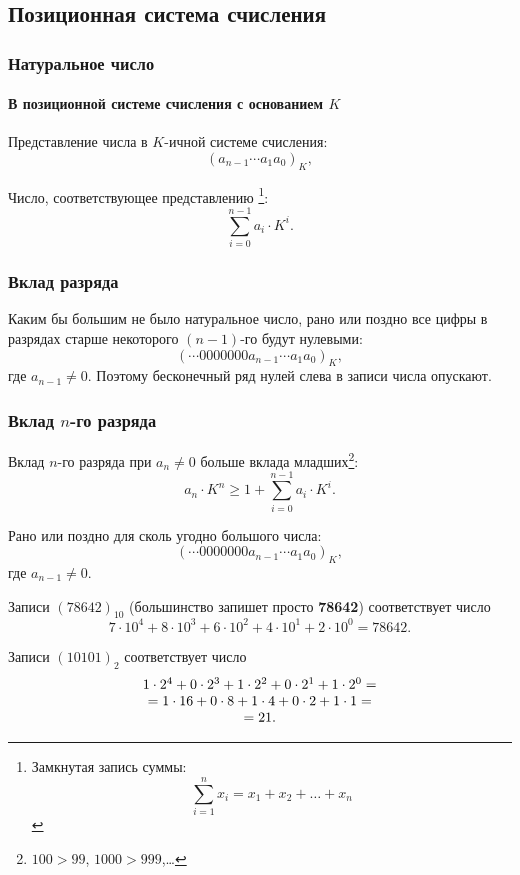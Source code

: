 \subsection{Позиционная система счисления}


\begin{frame}
    \frametitle{Натуральное число}
    \framesubtitle{В позиционной системе счисления с основанием $K$}

    Представление числа в $K$-ичной системе счисления:
    \[
        (a_{n-1}\cdots a_{1}a_{0})_K,
    \]
    
    Число, соответствующее представлению \footnote{Замкнутая запись суммы:\[\sum_{i=1}^{n}x_i = x_1 + x_2 + \ldots + x_n\]}:
    \[
        \sum_{i=0}^{n-1}a_i\cdot K^{i}.
    \]
\end{frame}

\begin{frame}
    \frametitle{Вклад разряда}

    Каким бы большим не было натуральное число, рано или поздно все цифры в разрядах старше некоторого $(n-1)$-го будут нулевыми:
    \[
        (\cdots 0000000a_{n-1}\cdots a_{1}a_{0})_K,
    \]
    где $a_{n-1}\neq 0$. Поэтому бесконечный ряд нулей слева в записи числа опускают.
\end{frame}

\begin{frame}
    \frametitle{Вклад $n$-го разряда}
    
    Вклад $n$-го разряда при $a_n\neq 0$ больше вклада младших\footnote{$100>99$, $1000>999$,\ldots}:
    \[
        a_n\cdot K^n \geq 1+\sum_{i=0}^{n-1}a_i\cdot K^i.
    \]

    Рано или поздно для сколь угодно большого числа:
    \[
        (\cdots 0000000a_{n-1}\cdots a_{1}a_{0})_K,
    \]
    где $a_{n-1}\neq 0$.
\end{frame}

\begin{frame}
    \begin{example}
        Записи $(78642)_{10}$ (большинство запишет просто \textbf{78642}) соответствует число
        \[
            7\cdot 10^{4}+
            8\cdot 10^{3}+
            6\cdot 10^{2}+
            4\cdot 10^{1}+
            2\cdot 10^{0}=78642.
        \]
    \end{example}
\end{frame}

\begin{frame}
    \begin{example}
        Записи $(10101)_{2}$  соответствует число
        \[
            \begin{array}[c]{c}
                1\cdot 2^{4}+
                0\cdot 2^{3}+
                1\cdot 2^{2}+
                0\cdot 2^{1}+
                1\cdot 2^{0} = \\
                =1\cdot 16+
                0\cdot 8+
                1\cdot 4+
                0\cdot 2+
                1\cdot 1 = \\
                = 21.
            \end{array}
        \]
    \end{example}
\end{frame}

